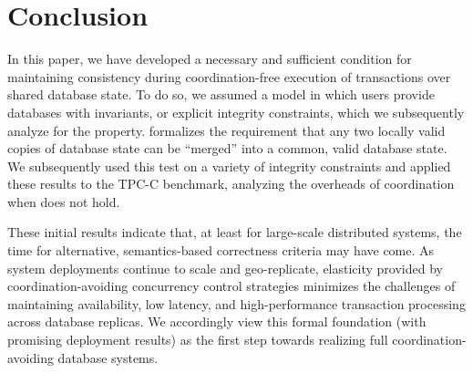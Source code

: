 
\section{Conclusion}
\label{sec:conclusion}

In this paper, we have developed a necessary and sufficient condition
for maintaining consistency during coordination-free execution of
transactions over shared database state. To do so, we assumed a model
in which users provide databases with invariants, or explicit
integrity constraints, which we subsequently analyze for the
\iconfluence property. \iconfluence formalizes the requirement that
any two locally valid copies of database state can be ``merged'' into a
common, valid database state. We subsequently used this test on a
variety of integrity constraints and applied these results to
the TPC-C benchmark, analyzing the overheads of coordination when
\iconfluence does not hold.

These initial results indicate that, at least for large-scale
distributed systems, the time for alternative, semantics-based
correctness criteria may have come. As system deployments continue to
scale and geo-replicate, elasticity provided by coordination-avoiding
concurrency control strategies minimizes the challenges of maintaining
availability, low latency, and high-performance transaction processing
across database replicas. We accordingly view this formal foundation
(with promising deployment results) as the first step towards
realizing full coordination-avoiding database systems.
